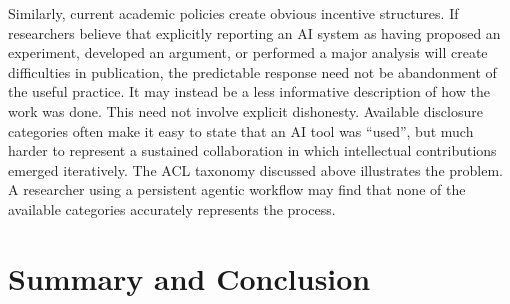 \documentclass[12pt]{article}
\begin{document}
Similarly, current academic policies create obvious incentive structures.
If researchers believe that explicitly reporting an AI system as having proposed an experiment, developed an argument, or performed a major analysis will create difficulties in publication, the predictable response need not be abandonment of the useful practice. It may instead be a less informative description of how the work was done.
This need not involve explicit dishonesty. Available disclosure categories often make it easy to state that an AI tool was ``used'', but much harder to represent a sustained collaboration in which intellectual contributions emerged iteratively.
The ACL taxonomy discussed above illustrates the problem. A researcher using a persistent agentic workflow may find that none of the available categories accurately represents the process.




\section{Summary and Conclusion}
\end{document}
